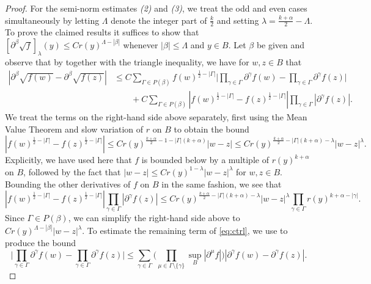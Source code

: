 \documentclass[oneside,hidelinks,indentfirst,10pt]{book}
\begin{document}
\begin{proof}
For the semi-norm estimates \textit{(2)} and \textit{(3)}, we treat the odd and even cases simultaneously by letting \(\Lambda\) denote the integer part of \(\frac{k}{2}\) and setting \(\lambda=\frac{k+\alpha}{2}-\Lambda\). To prove the claimed results it suffices to show that \([\partial^\beta\sqrt{f}]_{\lambda}(y)\leq Cr(y)^{\Lambda-|\beta|}\) whenever \(|\beta|\leq \Lambda\) and \(y\in B\). Let \(\beta\) be given and observe that by  together with the triangle inequality, we have for \(w,z\in B\) that
\begin{equation}\label{eq:ctrl}
\begin{split}
    |\partial^\beta\sqrt{f(w)}-\partial^\beta\sqrt{f(z)}|&\leq C\sum_{\Gamma\in P(\beta)} f(w)^{\frac{1}{2}-|\Gamma|}\bigg|\prod_{\gamma\in\Gamma}\partial^\gamma f(w)-\prod_{\gamma\in\Gamma}\partial^\gamma f(z)\bigg|\\
    &\qquad+C\sum_{\Gamma\in P(\beta)} |f(w)^{\frac{1}{2}-|\Gamma|}-f(z)^{\frac{1}{2}-|\Gamma|}|\prod_{\gamma\in\Gamma}|\partial^\gamma f(z)|.    
\end{split}
\end{equation}
We treat the terms on the right-hand side above separately, first using the Mean Value Theorem and slow variation of \(r\) on \(B\) to obtain the bound
\[
    |f(w)^{\frac{1}{2}-|\Gamma|}-f(z)^{\frac{1}{2}-|\Gamma|}|\leq Cr(y)^{\frac{k+\alpha}{2}-1-|\Gamma|(k+\alpha)}|w-z|\leq Cr(y)^{\frac{k+\alpha}{2}-|\Gamma|(k+\alpha)-\lambda}|w-z|^\lambda.
\]
Explicitly, we have used here that \(f\) is bounded below by a multiple of \(r(y)^{k+\alpha}\) on \(B\), followed by the fact that \(|w-z|\leq Cr(y)^{1-\lambda}|w-z|^\lambda\) for \(w,z\in B\). Bounding the other derivatives of \(f\) on \(B\) in the same fashion, we see that
\[
    |f(w)^{\frac{1}{2}-|\Gamma|}-f(z)^{\frac{1}{2}-|\Gamma|}|\prod_{\gamma\in\Gamma}|\partial^\gamma f(z)|\leq Cr(y)^{\frac{k+\alpha}{2}-|\Gamma|(k+\alpha)-\lambda}|w-z|^\lambda\prod_{\gamma\in\Gamma}r(y)^{k+\alpha-|\gamma|}.
\]
Since \(\Gamma\in P(\beta)\), we can simplify the right-hand side above to \(Cr(y)^{\Lambda-|\beta|}|w-z|^\lambda\). To estimate the remaining term of \eqref{eq:ctrl}, we use  to produce the bound
\begin{equation}\label{eq:sub}
    \bigg|\prod_{\gamma\in\Gamma}\partial^\gamma f(w)-\prod_{\gamma\in\Gamma}\partial^\gamma f(z)\bigg|\leq \sum_{\gamma\in\Gamma}\bigg(\prod_{\mu\in\Gamma\setminus\{\gamma\}}\sup_{B}|\partial^\mu f|\bigg)|\partial^\gamma f(w)-\partial^\gamma f(z)|.    
\end{equation}



\end{proof}
\end{document}
